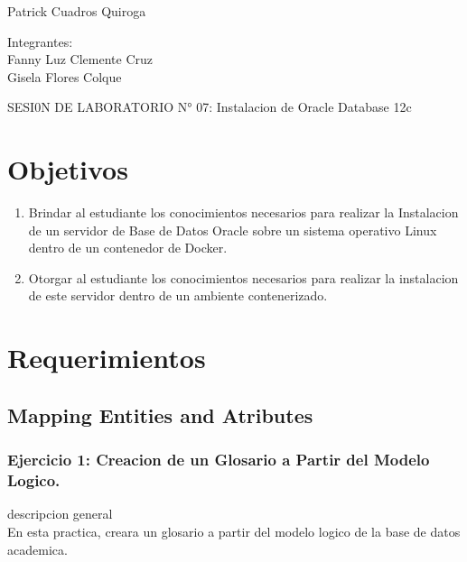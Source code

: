 \documentclass[12pt,letterpaper]{article}
\begin{document}
\begin{titlepage}
\begin{center}
\vspace*{0.1in}
\begin{large}
 Patrick Cuadros Quiroga\\
\end{large}

\vspace*{0.2in}
\vspace*{0.1in}
\begin{large}
Integrantes: \\
Fanny Luz Clemente Cruz \\
Gisela Flores Colque\\
\end{large}
\end{center}

\end{titlepage}




 \tableofcontents
 \newpage
SESI0N DE LABORATORIO N° 07:
Instalacion de Oracle Database 12c

 
\section{Objetivos} 

\begin{enumerate}[1.]
    \item Brindar al estudiante los conocimientos necesarios para realizar la Instalacion de un servidor de Base de Datos
Oracle sobre un sistema operativo Linux dentro de un contenedor de Docker.
    
   \item Otorgar al estudiante los conocimientos necesarios para realizar la instalacion de este servidor dentro de un
ambiente contenerizado.
		\end{enumerate} 
		


\section{Requerimientos} 
\subsection{Mapping Entities and Atributes}
\subsubsection{Ejercicio 1: Creacion de un Glosario a Partir del Modelo Logico.} 
descripcion general  \\
En esta practica, creara un glosario a partir del modelo logico de la base de datos academica. \\
\end{document}
